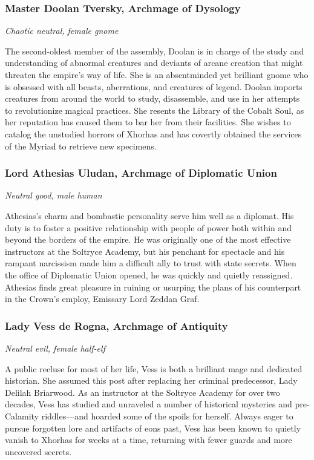 \documentclass[10pt,a4paper,twoside,bg=print,twocolumn,openany,nodeprecatedcode]{dndbook}
\begin{document}
\subsubsection{Master Doolan Tversky, Archmage of Dysology}
\textit{Chaotic neutral, female gnome}

The second-oldest member of the assembly, Doolan is in charge of the study and understanding of abnormal creatures and deviants of arcane creation that might threaten the empire's way of life. She is an absentminded yet brilliant gnome who is obsessed with all beasts, aberrations, and creatures of legend. Doolan imports creatures from around the world to study, disassemble, and use in her attempts to revolutionize magical practices. She resents the Library of the Cobalt Soul, as her reputation has caused them to bar her from their facilities. She wishes to catalog the unstudied horrors of Xhorhas and has covertly obtained the services of the Myriad to retrieve new specimens.

\subsubsection{Lord Athesias Uludan, Archmage of Diplomatic Union}
\textit{Neutral good, male human}

Athesias's charm and bombastic personality serve him well as a diplomat. His duty is to foster a positive relationship with people of power both within and beyond the borders of the empire. He was originally one of the most effective instructors at the Soltryce Academy, but his penchant for spectacle and his rampant narcissism made him a difficult ally to trust with state secrets. When the office of Diplomatic Union opened, he was quickly and quietly reassigned. Athesias finds great pleasure in ruining or usurping the plans of his counterpart in the Crown's employ, Emissary Lord Zeddan Graf.

\subsubsection{Lady Vess de Rogna, Archmage of Antiquity}
\textit{Neutral evil, female half-elf}

A public recluse for most of her life, Vess is both a brilliant mage and dedicated historian. She assumed this post after replacing her criminal predecessor, Lady Delilah Briarwood. As an instructor at the Soltryce Academy for over two decades, Vess has studied and unraveled a number of historical mysteries and pre-Calamity riddles—and hoarded some of the spoils for herself. Always eager to pursue forgotten lore and artifacts of eons past, Vess has been known to quietly vanish to Xhorhas for weeks at a time, returning with fewer guards and more uncovered secrets.
\end{document}
